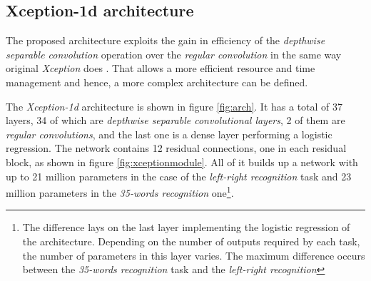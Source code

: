 \documentclass[review]{elsarticle}
\begin{document}
\subsection{Xception-1d architecture}
The proposed architecture exploits the gain in efficiency of the \textit{depthwise separable convolution} operation over the \textit{regular convolution} in the same way original \textit{Xception} does \cite{FChollet2017}. That allows a more efficient resource and time management and hence, a more complex architecture can be defined. 

The \textit{Xception-1d} architecture is shown in figure \ref{fig:arch}. It has a total of 37 layers, 34 of which are \textit{depthwise separable convolutional layers}, 2 of them are \textit{regular convolutions}, and the last one is a dense layer performing a logistic regression. The network contains 12 residual connections, one in each residual block, as shown in figure \ref{fig:xceptionmodule}. All of it builds up a network with up to 21 million parameters in the case of the \textit{left-right recognition}  task and 23 million parameters in the \textit{35-words recognition} one\footnote{The difference lays on the last layer implementing the logistic regression of the architecture. Depending on the number of outputs required by each task, the number of parameters in this layer varies. The maximum difference occurs between the \textit{35-words recognition} task and the \textit{left-right recognition}}.
\end{document}
